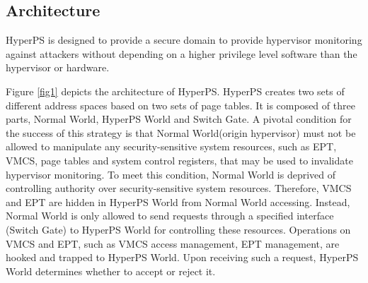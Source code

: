 \documentclass[conference]{IEEEtran}
\begin{document}
\subsection{Architecture} 

HyperPS is designed to provide a secure domain to provide hypervisor monitoring against attackers without depending on a higher privilege level software than the hypervisor or hardware.




Figure \ref{fig1} depicts the architecture of HyperPS. HyperPS creates two sets of different address spaces based on two sets of page tables. It is composed of three parts, Normal World, HyperPS World and Switch Gate. 
A pivotal condition for the success of this strategy is that Normal World(origin hypervisor) must not be allowed to manipulate any security-sensitive system resources, such as EPT, VMCS, page tables and system control registers, that may be used to invalidate hypervisor monitoring. To meet this condition, Normal World is deprived of controlling authority over security-sensitive system resources. Therefore, VMCS and EPT are hidden in HyperPS World from Normal World accessing. Instead, Normal World is only allowed to send requests through a specified interface (Switch Gate) to HyperPS World for controlling these resources. Operations on VMCS and EPT, such as VMCS access management, EPT management, are hooked and trapped to HyperPS World. Upon receiving such a request, HyperPS World determines whether to accept or reject it.
\end{document}

